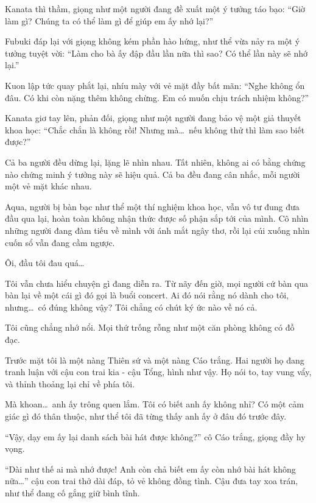 \documentclass[../main.tex]{subfiles}
\begin{document}

Kanata thì thầm, giọng như một người đang đề xuất một ý tưởng táo bạo: ``Giờ làm gì? Chúng ta có thể làm gì để giúp em ấy nhớ lại?''

Fubuki đáp lại với giọng không kém phần hào hứng, như thể vừa nảy ra một ý tưởng tuyệt vời: ``Làm cho bà ấy đập đầu lần nữa thì sao? Có thể lần này sẽ nhớ lại.''

Kuon lập tức quay phắt lại, nhíu mày với vẻ mặt đầy bất mãn: ``Nghe không ổn đâu. Có khi còn nặng thêm không chừng. Em có muốn chịu trách nhiệm không?''

Kanata giơ tay lên, phản đối, giọng như một người đang bảo vệ một giả thuyết khoa học: ``Chắc chắn là không rồi! Nhưng mà\dots\ nếu không thử thì làm sao biết được?''

Cả ba người đều dừng lại, lặng lẽ nhìn nhau. Tất nhiên, không ai có bằng chứng nào chứng minh ý tưởng này sẽ hiệu quả. Cả ba đều đang cân nhắc, mỗi người một vẻ mặt khác nhau.

Aqua, người bị bàn bạc như thể một thí nghiệm khoa học, vẫn vô tư đung đưa đầu qua lại, hoàn toàn không nhận thức được số phận sắp tới của mình. Cô nhìn những người đang đàm tiếu về mình với ánh mắt ngây thơ, rồi lại cúi xuống nhìn cuốn sổ vẫn đang cầm ngược.


Ôi, đầu tôi đau quá\dots

Tôi vẫn chưa hiểu chuyện gì đang diễn ra. Từ nãy đến giờ, mọi người cứ bàn qua bàn lại về một cái gì đó gọi là buổi concert. Ai đó nói rằng nó dành cho tôi, nhưng\dots\ có đúng không vậy? Tôi chẳng có chút ký ức nào về nó cả.

Tôi cũng chẳng nhớ nổi. Mọi thứ trống rỗng như một căn phòng không có đồ đạc.

Trước mặt tôi là một nàng Thiên sứ và một nàng Cáo trắng. Hai người họ đang tranh luận với cậu con trai kia - cậu Tổng, hình như vậy. Họ nói to, tay vung vẩy, và thỉnh thoảng lại chỉ về phía tôi.

Mà khoan\dots\ anh ấy trông quen lắm. Tôi có biết anh ấy không nhỉ? Có một cảm giác gì đó thân thuộc, như thể tôi đã từng thấy anh ấy ở đâu đó trước đây.

``Vậy, dạy em ấy lại danh sách bài hát được không?'' cô Cáo trắng, giọng đầy hy vọng.

``Dài như thế ai mà nhớ được! Anh còn chả biết em ấy còn nhớ bài hát không nữa\dots'' cậu con trai thở dài đáp, tỏ vẻ không đồng tình. Cậu đưa tay xoa trán, như thể đang cố gắng giữ bình tĩnh.
\end{document}
